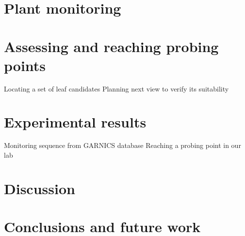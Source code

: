 \documentclass[letterpaper, 10 pt, conference]{ieeeconf}  %
\begin{document}
\section{Plant monitoring}
\label{sec:monitoring}
\section{Assessing and reaching probing points}
\label{sec:probing}
     Locating a set of leaf candidates
        Planning next view to verify its suitability


\section{Experimental results}
\label{sec:experiments}
     Monitoring sequence from GARNICS database
     Reaching a probing point in our lab



\section{Discussion}
\label{sec:discussion}
\section{Conclusions and future work}
\label{sec:conclusions}




\end{document}
